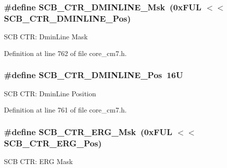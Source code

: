 \subsubsection[{\texorpdfstring{S\+C\+B\+\_\+\+C\+T\+R\+\_\+\+D\+M\+I\+N\+L\+I\+N\+E\+\_\+\+Msk}{SCB_CTR_DMINLINE_Msk}}]{\setlength{\rightskip}{0pt plus 5cm}\#define S\+C\+B\+\_\+\+C\+T\+R\+\_\+\+D\+M\+I\+N\+L\+I\+N\+E\+\_\+\+Msk~(0x\+F\+U\+L $<$$<$ S\+C\+B\+\_\+\+C\+T\+R\+\_\+\+D\+M\+I\+N\+L\+I\+N\+E\+\_\+\+Pos)}\hypertarget{group___c_m_s_i_s___s_c_b_ga634bb0b270954a68757c86c517de948b}{}\label{group___c_m_s_i_s___s_c_b_ga634bb0b270954a68757c86c517de948b}
S\+CB C\+TR\+: Dmin\+Line Mask 

Definition at line 762 of file core\+\_\+cm7.\+h.

\subsubsection[{\texorpdfstring{S\+C\+B\+\_\+\+C\+T\+R\+\_\+\+D\+M\+I\+N\+L\+I\+N\+E\+\_\+\+Pos}{SCB_CTR_DMINLINE_Pos}}]{\setlength{\rightskip}{0pt plus 5cm}\#define S\+C\+B\+\_\+\+C\+T\+R\+\_\+\+D\+M\+I\+N\+L\+I\+N\+E\+\_\+\+Pos~16U}\hypertarget{group___c_m_s_i_s___s_c_b_gae25b69e6ea66c125f703870adabb0d65}{}\label{group___c_m_s_i_s___s_c_b_gae25b69e6ea66c125f703870adabb0d65}
S\+CB C\+TR\+: Dmin\+Line Position 

Definition at line 761 of file core\+\_\+cm7.\+h.

\subsubsection[{\texorpdfstring{S\+C\+B\+\_\+\+C\+T\+R\+\_\+\+E\+R\+G\+\_\+\+Msk}{SCB_CTR_ERG_Msk}}]{\setlength{\rightskip}{0pt plus 5cm}\#define S\+C\+B\+\_\+\+C\+T\+R\+\_\+\+E\+R\+G\+\_\+\+Msk~(0x\+F\+U\+L $<$$<$ S\+C\+B\+\_\+\+C\+T\+R\+\_\+\+E\+R\+G\+\_\+\+Pos)}\hypertarget{group___c_m_s_i_s___s_c_b_ga02bb1ed5199a32e0ebad001e1b64ac35}{}\label{group___c_m_s_i_s___s_c_b_ga02bb1ed5199a32e0ebad001e1b64ac35}
S\+CB C\+TR\+: E\+RG Mask 

